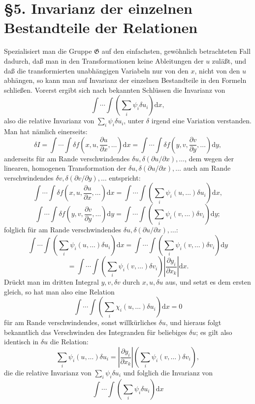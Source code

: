 \documentclass[11pt]{article}
\newcommand{\dd}{\mathrm d}
\newcommand{\G}{\mathfrak G}
\newcommand{\p}{\partial}
\begin{document}
\section*{\S{}5. Invarianz der einzelnen Bestandteile der Relationen}

Spezialisiert man die Gruppe \(\G\) auf den einfachsten, gewöhnlich betrachteten Fall dadurch, daß man in den Transformationen keine Ableitungen der \(u\) zuläßt, und daß die transformierten unabhängigen Variabeln nur von den \(x\), nicht von den \(u\) abhängen, so kann man auf Invarianz der einzelnen Bestandteile in den Formeln schließen. Vorerst ergibt sich nach bekannten Schlüssen die Invarianz von
\[
\int\!\cdots\!\int\left(\sum_i\psi_i\delta u_i\right)\dd x,
\]
also die relative Invarianz von \(\sum_i\psi_i\delta u_i\), unter \(\delta\) irgend eine Variation verstanden. Man hat nämlich einerseits:
\[
\delta I
=\int\!\cdots\!\int \delta f\!\left(x,u,\frac{\p u}{\p x},\ldots\right)\dd x
=\int\!\cdots\!\int \delta f\!\left(y,v,\frac{\p v}{\p y},\ldots\right)\dd y,
\]
anderseits für am Rande verschwindendes \(\delta u,\delta(\p u/\p x),\ldots\), dem wegen der linearen, homogenen Transformation der \(\delta u,\delta(\p u/\p x),\ldots\) auch am Rande verschwindendes \(\delta v,\delta(\p v/\p y),\ldots\) entspricht:
\[
\int\!\cdots\!\int \delta f\!\left(x,u,\frac{\p u}{\p x},\ldots\right)\dd x
=
\int\!\cdots\!\int\left(\sum_i\psi_i(u,\ldots)\delta u_i\right)\dd x,
\]
\[
\int\!\cdots\!\int \delta f\!\left(y,v,\frac{\p v}{\p y},\ldots\right)\dd y
=
\int\!\cdots\!\int\left(\sum_i\psi_i(v,\ldots)\delta v_i\right)\dd y;
\]
folglich für am Rande verschwindendes \(\delta u,\delta(\p u/\p x),\ldots\):
\[
\int\!\cdots\!\int\left(\sum_i\psi_i(u,\ldots)\delta u_i\right)\dd x
=
\int\!\cdots\!\int\left(\sum_i\psi_i(v,\ldots)\delta v_i\right)\dd y
\]
\[
=
\int\!\cdots\!\int\left(\sum_i\psi_i(v,\ldots)\delta v_i\right)
\left|\frac{\p y_i}{\p x_k}\right|\dd x.
\]
Drückt man im dritten Integral \(y,v,\delta v\) durch \(x,u,\delta u\) aus, und setzt es dem ersten gleich, so hat man also eine Relation
\[
\int\!\cdots\!\int\left(\sum_i\chi_i(u,\ldots)\delta u_i\right)\dd x=0
\]
für am Rande verschwindendes, sonst willkürliches \(\delta u\), und hieraus folgt bekanntlich das Verschwinden des Integranden für beliebiges \(\delta u\); es gilt also identisch in \(\delta u\) die Relation:
\[
\sum_i\psi_i(u,\ldots)\delta u_i
=
\left|\frac{\p y_i}{\p x_k}\right|
\left(\sum_i\psi_i(v,\ldots)\delta v_i\right),
\]
die die relative Invarianz von \(\sum_i\psi_i\delta u_i\) und folglich die Invarianz von
\[
\int\!\cdots\!\int\left(\sum_i\psi_i\delta u_i\right)\dd x
\]
\end{document}
